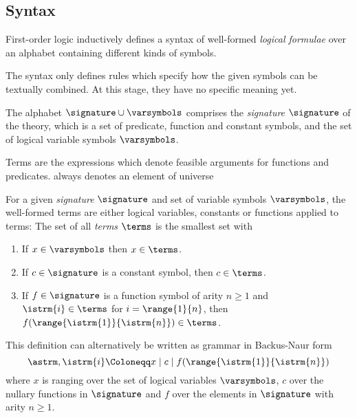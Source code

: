         \subsection{Syntax}
            \label{sec:FOL-syntax}

            First-order logic inductively defines a syntax of well-formed \emph{logical formulae} over an alphabet containing different kinds of symbols.

            The syntax only defines rules which specify how the given symbols can be textually combined. At this stage, they have no specific meaning yet.

            The alphabet $\signature\cup\varsymbols$ comprises the \emph{signature} $\signature$ of the theory, which is a set of predicate, function and constant symbols, and the set of logical variable symbols $\varsymbols$.

            Terms are the expressions which denote feasible arguments for functions and predicates. always denotes an element of universe
            \begin{definition}[Terms]
                For a given \emph{signature} $\signature$ and set of variable symbols $\varsymbols$, the well-formed terms are either logical variables, constants or functions applied to terms:
                The set of all \emph{terms} $\terms$ is the smallest set with
                \begin{enumerate}
                    \item If $x\in\varsymbols$ then $x\in\terms$.
                    \item If $c\in\signature$ is a constant symbol, then $c\in\terms$.
                    \item If $f\in\signature$ is a function symbol of arity $n\geq 1$ and $\istrm{i}\in\terms$ for $i=\range{1}{n}$, then $f(\range{\istrm{1}}{\istrm{n}})\in\terms$.
                \end{enumerate}
                This definition can alternatively be written as grammar in Backus-Naur form
                \begin{equation}
                    \astrm,\istrm{i} \Coloneqq
                        x \mid
                        c \mid
                        f(\range{\istrm{1}}{\istrm{n}})
                \end{equation}
                where $x$ is ranging over the set of logical variables $\varsymbols$, $c$ over the nullary functions in $\signature$ and $f$ over the elements in $\signature$ with arity $n\geq 1$.
            \end{definition}

